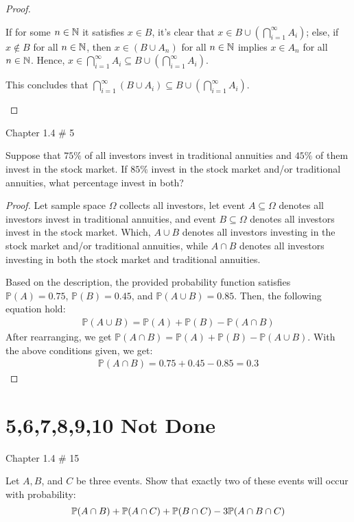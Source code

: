 \documentclass{article}
\begin{document}
\begin{proof}
\begin{itemize}
\begin{itemize}
            If for some $n\in\mathbb{N}$ it satisfies $x\in B$, it's clear that $x\in B\cup (\bigcap_{i=1}^\infty A_i)$; else, if $x\notin B$ for all $n\in\mathbb{N}$, then $x\in (B\cup A_n)$ for all $n\in\mathbb{N}$ implies $x\in A_n$ for all $n\in\mathbb{N}$. Hence, $x\in \bigcap_{i=1}^\infty A_i \subseteq B\cup (\bigcap_{i=1}^\infty A_i)$.

            This concludes that $\bigcap_{i=1}^\infty(B\cup A_i)\subseteq B\cup (\bigcap_{i=1}^\infty A_i)$.
        \end{itemize}
    \end{itemize}
\end{proof}

\newpage

\begin{ques}\label{q4}
    Chapter 1.4 \# 5

    Suppose that $75\%$ of all investors invest in traditional annuities and $45\%$ of them invest in the stock market. If $85\%$ invest in the stock market and/or traditional annuities, what percentage invest in both?
\end{ques}

\begin{proof}
    Let sample space $\Omega$ collects all investors, let event $A\subseteq \Omega$ denotes all investors invest in traditional annuities, and event $B\subseteq \Omega$ denotes all investors invest in the stock market. Which, $A\cup B$ denotes all investors investing in the stock market and/or traditional annuities, while $A\cap B$ denotes all investors investing in both the stock market and traditional annuities.

    Based on the description, the provided probability function satisfies $\mathbb{P}(A)=0.75$, $\mathbb{P}(B)=0.45$, and $\mathbb{P}(A\cup B)=0.85$. Then, the following equation hold:
    \begin{align}
        \mathbb{P}(A\cup B)=\mathbb{P}(A)+\mathbb{P}(B)-\mathbb{P}(A\cap B)
    \end{align}
    After rearranging, we get $\mathbb{P}(A\cap B)=\mathbb{P}(A)+\mathbb{P}(B)-\mathbb{P}(A\cup B)$. With the above conditions given, we get:
    \begin{align}
        \mathbb{P}(A\cap B)=0.75+0.45-0.85 = 0.3
    \end{align}
\end{proof}

\hfil

\section*{5,6,7,8,9,10 Not Done}
\begin{ques}\label{q5}
    Chapter 1.4 \# 15

    Let $A,B$, and $C$ be three events. Show that exactly two of these events will occur with probability:
    $$\mathbb{P}(A\cap B)+\mathbb{P}(A\cap C)+\mathbb{P}(B\cap C)-3\mathbb{P}(A\cap B\cap C)$$
\end{ques}
\end{document}
